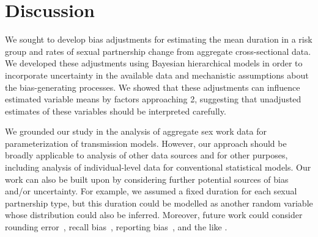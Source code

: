 \section{Discussion}
We sought to develop bias adjustments for estimating
the mean duration in a risk group and rates of sexual partnership change
from aggregate cross-sectional data.
We developed these adjustments using Bayesian hierarchical models in order to incorporate
uncertainty in the available data and mechanistic assumptions about the bias-generating processes.
We showed that these adjustments can influence estimated variable means by factors approaching 2,
suggesting that unadjusted estimates of these variables should be interpreted carefully.
\par
We grounded our study in the analysis of
aggregate sex work data for parameterization of transmission models.
However, our approach should be broadly applicable to
analysis of other data sources and for other purposes,
including analysis of individual-level data for conventional statistical models.
Our work can also be built upon by considering
further potential sources of bias and/or uncertainty.
For example, we assumed a fixed duration for each sexual partnership type,
but this duration could be modelled as another random variable
whose distribution could also be inferred.
Moreover, future work could consider
rounding error~\cite{Mills2014},
recall bias~\cite{Ramjee1999},
reporting bias~\cite{Lowndes2012},
and the like \cite{Fenton2001}.
